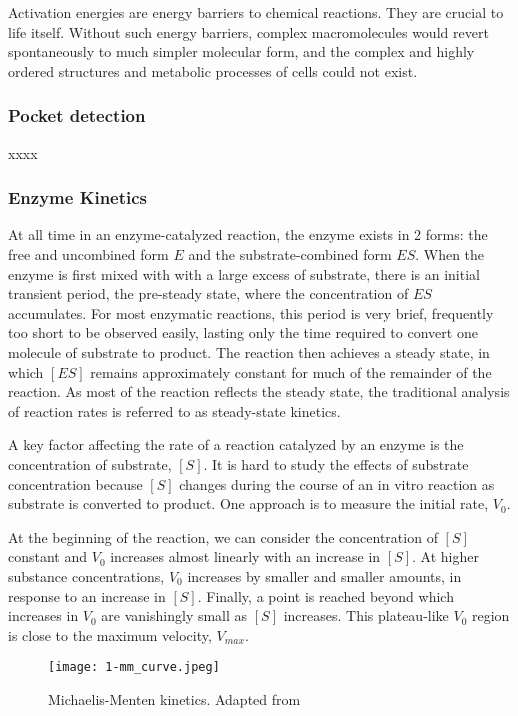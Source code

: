 Activation energies are energy barriers to chemical reactions. They are crucial to life 
itself. Without such energy barriers, complex macromolecules would revert spontaneously 
to much simpler molecular form, and the complex and highly ordered structures and metabolic 
processes of cells could not exist.


\subsubsection{Pocket detection}
xxxx

\subsubsection{Enzyme Kinetics}
At all time in an enzyme-catalyzed reaction, the enzyme exists in 2 forms: the free and uncombined 
form $E$ and the substrate-combined form $ES$.
When the enzyme is first mixed with with a large excess of substrate, there is an initial 
transient period, the pre-steady state, where the concentration of $ES$ accumulates.
For most enzymatic reactions, this period is very brief, frequently too short to be observed easily, 
lasting only the time required to convert one molecule of substrate to product.
The reaction then achieves a steady state, in which $[ES]$ remains approximately constant for much of 
the remainder of the reaction. As most of the reaction reflects the steady state, the traditional 
analysis of reaction rates is referred to as steady-state kinetics.

A key factor affecting the rate of a reaction catalyzed by an enzyme is the concentration 
of substrate, $[S]$.
It is hard to study the effects of substrate concentration because $[S]$ changes 
during the course of an in vitro reaction as substrate is converted to product. 
One approach is to measure the initial rate, $V_0$.

At the beginning of the reaction, we can consider the concentration of $[S]$ constant and
 $V_0$ increases almost linearly with an increase in $[S]$. 
At higher substance concentrations, $V_0$ increases by smaller and smaller amounts, in response 
to an increase in $[S]$. Finally, a point is reached beyond which increases in $V_0$ are 
vanishingly small as $[S]$ increases. This plateau-like $V_0$ region is close to the 
maximum velocity, $V_{max}$.

\begin{figure}
  \centering
  \texttt{[image: 1-mm\_curve.jpeg]}
  \caption{Michaelis-Menten kinetics. Adapted from \citeauthor{lehninger}}
  \label{fig:mm_curve}
\end{figure}

